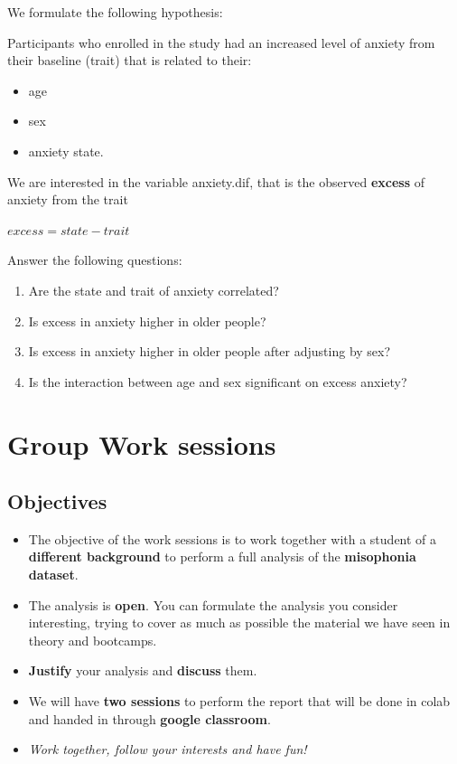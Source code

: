 \documentclass[
]{book}
\providecommand{\tightlist}{%
  \setlength{\itemsep}{0pt}\setlength{\parskip}{0pt}}
\begin{document}
We formulate the following hypothesis:

Participants who enrolled in the study had an increased level of anxiety from their baseline (trait) that is related to their:

\begin{itemize}
\tightlist
\item
  age
\item
  sex
\item
  anxiety state.
\end{itemize}

We are interested in the variable anxiety.dif, that is the observed \textbf{excess} of anxiety from the trait

\(excess = state - trait\)

Answer the following questions:

\begin{enumerate}
\def\labelenumi{\arabic{enumi}.}
\item
  Are the state and trait of anxiety correlated?
\item
  Is excess in anxiety higher in older people?
\item
  Is excess in anxiety higher in older people after adjusting by sex?
\item
  Is the interaction between age and sex significant on excess anxiety?
\end{enumerate}

\hypertarget{group-work-sessions}{%
\chapter{Group Work sessions}\label{group-work-sessions}}

\hypertarget{objectives}{%
\section{Objectives}\label{objectives}}

\begin{itemize}
\item
  The objective of the work sessions is to work together with a student of a \textbf{different background} to perform a full analysis of the \textbf{misophonia dataset}.
\item
  The analysis is \textbf{open}. You can formulate the analysis you consider interesting, trying to cover as much as possible the material we have seen in theory and bootcamps.
\item
  \textbf{Justify} your analysis and \textbf{discuss} them.
\item
  We will have \textbf{two sessions} to perform the report that will be done in colab and handed in through \textbf{google classroom}.
\item
  \emph{Work together, follow your interests and have fun!}
\end{itemize}
\end{document}
